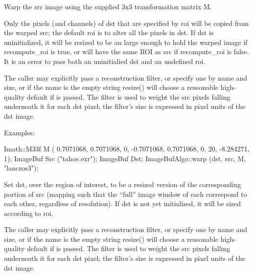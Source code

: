 Warp the {\cf src} image using the supplied 3x3 transformation matrix {\cf M}.

Only the pixels (and channels) of {\cf dst} that are specified by {\cf roi}
will be copied from the warped {\cf src}; the default {\cf roi} is to alter
all the pixels in {\cf dst}. If {\cf dst} is uninitialized, it will be
resized to be an \ImageBuf large enough to hold the warped image if
{\cf recompute_roi} is {\cf true}, or will have the same ROI as {\cf src}
if {\cf recompute_roi} is false. It is an
error to pass both an uninitialied {\cf dst} and an undefined {\cf roi}.

The caller may explicitly pass a reconstruction filter, or specify one by
name and size, or if the name is the empty string {\cf resize()} will choose
a reasonable high-quality default if \NULL is passed.  The filter is used to
weight the {\cf src} pixels falling underneath it for each {\cf dst} pixel;
the filter's size is expressed in pixel units of the {\cf dst} image.

\smallskip
\noindent Examples:
\begin{code}
    Imath::M33f M ( 0.7071068, 0.7071068, 0,
                   -0.7071068, 0.7071068, 0,
                   20,        -8.284271,  1);
    ImageBuf Src ("tahoe.exr");
    ImageBuf Dst;
    ImageBufAlgo::warp (dst, src, M, "lanczos3");
\end{code}
\apiend


 
Set {\cf dst}, over the region of interest, to be a resized version of the
corresponding portion of {\cf src} (mapping such that the ``full'' image
window of each correspond to each other, regardless of resolution).  If
{\cf dst} is not yet initialized, it will be sized according to {\cf roi}.

The caller may explicitly pass a reconstruction filter, or specify one by
name and size, or if the name is the empty string {\cf resize()} will choose
a reasonable high-quality default if \NULL is passed.  The filter is used to
weight the {\cf src} pixels falling underneath it for each {\cf dst} pixel;
the filter's size is expressed in pixel units of the {\cf dst} image.


